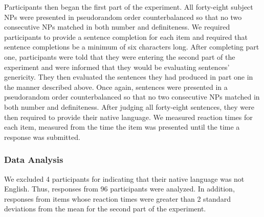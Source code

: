 \documentclass[10pt,letterpaper]{article}
\begin{document}
Participants then began the first part of the experiment. All forty-eight subject NPs were presented in pseudorandom order counterbalanced so that no two consecutive NPs matched in both number and definiteness. We required participants to provide a sentence completion for each item and required that sentence completions be a minimum of six characters long. After completing part one, participants were told that they were entering the second part of the experiment and were informed that they would be evaluating sentences' genericity. They then evaluated the sentences they had produced in part one in the manner described above. Once again, sentences were presented in a pseudorandom order counterbalanced so that no two consecutive NPs matched in both number and definiteness. After judging all forty-eight sentences, they were then required to provide their native language. We measured reaction times for each item, measured from the time the item was presented until the time a response was submitted. 

\subsubsection{Data Analysis} \quad We excluded 4 participants for indicating that their native language was not English. Thus, responses from 96 participants were analyzed. In addition, responses from items whose reaction times were greater than 2 standard deviations from the mean for the second part of the experiment.
\end{document}
